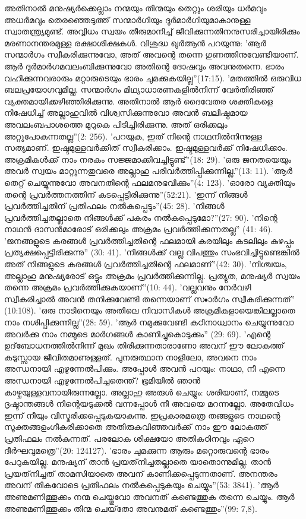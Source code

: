 അതിനാല്‍ മനുഷ്യര്‍ക്കെല്ലാം നന്മയും തിന്മയും തെറ്റും ശരിയും ധര്‍മവും അധര്‍മവും തെരഞ്ഞെടുത്ത് സന്മാര്‍ഗിയും ദുര്‍മാര്‍ഗിയുമാകാനുള്ള സ്വാതന്ത്യ്രമുണ്ട്. അവ്വിധം സ്വയം തീരുമാനിച്ച് ജീവിക്കുന്നതിനനുസരിച്ചായിരിക്കും മരണാനന്തരമുള്ള രക്ഷാശിക്ഷകള്‍. വിശുദ്ധ ഖുര്‍ആന്‍ പറയുന്നു: 'ആര്‍ സന്മാര്‍ഗം സ്വീകരിക്കുന്നുവോ, അത് അവന്റെ തന്നെ ഗുണത്തിനുവേണ്ടിയാണ്. ആര്‍ ദുര്‍മാര്‍ഗമവലംബിക്കുന്നുവോ അതിന്റെ ദോഷവും അവനുതന്നെ. ഭാരം വഹിക്കുന്നവരാരും മറ്റാരുടെയും ഭാരം ചുമക്കുകയില്ല''(17:15). 'മതത്തില്‍ ഒരുവിധ ബലപ്രയോഗവുമില്ല. സന്മാര്‍ഗം മിഥ്യാധാരണകളില്‍നിന്ന് വേര്‍തിരിഞ്ഞ് വ്യക്തമായിക്കഴിഞ്ഞിരിക്കുന്നു. അതിനാല്‍ ആര്‍ ദൈവേതര ശക്തികളെ നിഷേധിച്ച് അല്ലാഹുവില്‍ വിശ്വസിക്കുന്നുവോ അവന്‍ ബലിഷ്ഠമായ അവലംബപാശത്തെ മുറുകെ പിടിച്ചിരിക്കുന്നു. അത് ഒരിക്കലും അറ്റുപോകുന്നതല്ല''(2: 256). 'പറയുക, ഇത് നിന്റെ നാഥനില്‍നിന്നുള്ള സത്യമാണ്. ഇഷ്ടമുള്ളവര്‍ക്കിത് സ്വീകരിക്കാം. ഇഷ്ടമുള്ളവര്‍ക്ക് നിഷേധിക്കാം. അക്രമികള്‍ക്ക് നാം നരകം സജ്ജമാക്കിവച്ചിട്ടുണ്ട്''(18: 29). 'ഒരു ജനതയെയും അവര്‍ സ്വയം മാറ്റുന്നതുവരെ അല്ലാഹു പരിവര്‍ത്തിപ്പിക്കുന്നില്ല.''(13: 11). 'ആര്‍ തെറ്റ് ചെയ്യുന്നുവോ അവനതിന്റെ ഫലമനുഭവിക്കും''(4: 123). 'ഓരോ വ്യക്തിയും തന്റെ പ്രവര്‍ത്തനത്തിന് കടപ്പെട്ടിരിക്കുന്നു''(52:21). 'ഇന്ന് നിങ്ങള്‍ പ്രവര്‍ത്തിച്ചതിന് പ്രതിഫലം നല്‍കപ്പെടും''(45: 28). 'നിങ്ങള്‍ പ്രവര്‍ത്തിച്ചതല്ലാതെ നിങ്ങള്‍ക്ക് പകരം നല്‍കപ്പെടുമോ?''(27: 90). 'നിന്റെ നാഥന്‍ ദാസന്‍മാരോട് ഒരിക്കലും അക്രമം പ്രവര്‍ത്തിക്കുന്നതല്ല'' (41: 46). 'ജനങ്ങളുടെ കരങ്ങള്‍ പ്രവര്‍ത്തിച്ചതിന്റെ ഫലമായി കരയിലും കടലിലും കുഴപ്പം പ്രത്യക്ഷപ്പെട്ടിരിക്കുന്നു'' (30: 41). 'നിങ്ങള്‍ക്ക് വല്ല വിപത്തും സംഭവിച്ചിട്ടുണ്ടെങ്കില്‍ അത് നിങ്ങളുടെ കരങ്ങള്‍ പ്രവര്‍ത്തിച്ചതിന്റെ ഫലമാണ്''(42: 30). 'നിശ്ചയം, അല്ലാഹു മനുഷ്യരോട് ഒട്ടും അക്രമം പ്രവര്‍ത്തിക്കുന്നില്ല. പ്രത്യുത, മനുഷ്യര്‍ സ്വയം തന്നെ അക്രമം പ്രവര്‍ത്തിക്കുകയാണ്''(10: 44). 'വല്ലവനും നേര്‍വഴി സ്വീകരിച്ചാല്‍ അവന്‍ തനിക്കുവേണ്ടി തന്നെയാണ് സ•ാര്‍ഗം സ്വീകരിക്കുന്നത്'' (10:108). 'ഒരു നാടിനെയും അതിലെ നിവാസികള്‍ അക്രമികളായെങ്കിലല്ലാതെ നാം നശിപ്പിക്കുന്നില്ല''(28: 59). 'ആര്‍ നമുക്കുവേണ്ടി കഠിനാധ്വാനം ചെയ്യുന്നുവോ അവര്‍ക്കു നാം നമ്മുടെ മാര്‍ഗങ്ങള്‍ കാണിച്ചുകൊടുക്കും'' (29: 69). 'എന്റെ ഉദ്‌ബോധനത്തില്‍നിന്ന് മുഖം തിരിക്കുന്നതാരാണോ അവന് ഈ ലോകത്ത് കുടുസ്സായ ജീവിതമാണുള്ളത്. പുനരുത്ഥാന നാളിലോ, അവനെ നാം അന്ധനായി എഴുന്നേല്‍പിക്കും. അപ്പോള്‍ അവന്‍ പറയും: നാഥാ, നീ എന്നെ അന്ധനായി എഴുന്നേല്‍പിച്ചതെന്ത്? ഭൂമിയില്‍ ഞാന്‍ കാഴ്ചയുള്ളവനായിരുന്നല്ലോ. അല്ലാഹു അരുള്‍ ചെയ്യും: ശരിയാണ്, നമ്മുടെ ദൃഷ്ടാന്തങ്ങള്‍ നിന്റെയടുക്കല്‍ വന്നപ്പോള്‍ നീ അവയെ മറന്നല്ലോ. അതേവിധം ഇന്ന് നീയും വിസ്മരിക്കപ്പെടുകയാകുന്നു. ഇപ്രകാരമത്രെ തങ്ങളുടെ നാഥന്റെ സൂക്തങ്ങളംഗീകരിക്കാതെ അതിരുകവിഞ്ഞവര്‍ക്ക് നാം ഈ ലോകത്ത് പ്രതിഫലം നല്‍കുന്നത്. പരലോക ശിക്ഷയോ അതികഠിനവും ഏറെ ദീര്‍ഘവുമത്രെ''(20: 124127). 'ഭാരം ചുമക്കുന്ന ആരും മറ്റൊരുവന്റെ ഭാരം പേറുകയില്ല. മനുഷ്യന് താന്‍ പ്രയത്‌നിച്ചതല്ലാതെ യാതൊന്നുമില്ല. താന്‍ പ്രയത്‌നിച്ചത് താമസിയാതെ അവന് കാണിക്കപ്പെടുന്നതാണ്. അനന്തരം അവന് തികവോടെ പ്രതിഫലം നല്‍കപ്പെടുകയും ചെയ്യും''(53: 3841). 'ആര്‍ അണുമണിത്തൂക്കം നന്മ ചെയ്തുവോ അവനത് കണ്ടെത്തുക തന്നെ ചെയ്യും. ആര്‍ അണുമണിത്തൂക്കം തിന്മ ചെയ്‌തോ അവനുമത് കണ്ടെത്തും''(99: 7,8).
